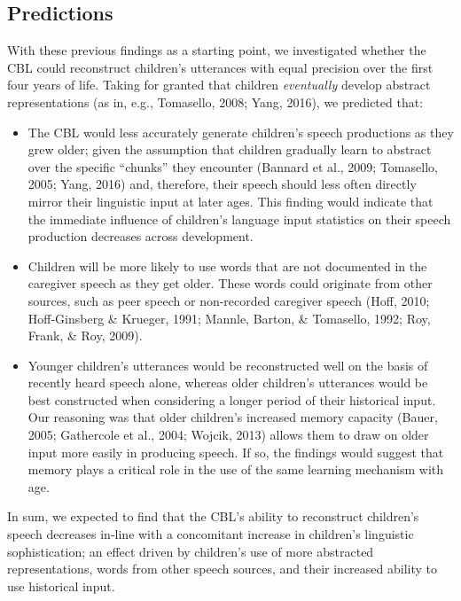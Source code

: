 \documentclass[
  english,
  man,floatsintext]{apa6}
\providecommand{\tightlist}{%
  \setlength{\itemsep}{0pt}\setlength{\parskip}{0pt}}
\begin{document}
\hypertarget{predictions}{%
\subsection{Predictions}\label{predictions}}

With these previous findings as a starting point, we investigated whether the CBL could reconstruct children's utterances with equal precision over the first four years of life. Taking for granted that children \emph{eventually} develop abstract representations (as in, e.g., Tomasello, 2008; Yang, 2016), we predicted that:

\begin{itemize}
\tightlist
\item
  The CBL would less accurately generate children's speech productions as they grew older; given the assumption that children gradually learn to abstract over the specific \enquote{chunks} they encounter (Bannard et al., 2009; Tomasello, 2005; Yang, 2016) and, therefore, their speech should less often directly mirror their linguistic input at later ages. This finding would indicate that the immediate influence of children's language input statistics on their speech production decreases across development.
\item
  Children will be more likely to use words that are not documented in the caregiver speech as they get older. These words could originate from other sources, such as peer speech or non-recorded caregiver speech (Hoff, 2010; Hoff-Ginsberg \& Krueger, 1991; Mannle, Barton, \& Tomasello, 1992; Roy, Frank, \& Roy, 2009).
\item
  Younger children's utterances would be reconstructed well on the basis of recently heard speech alone, whereas older children's utterances would be best constructed when considering a longer period of their historical input. Our reasoning was that older children's increased memory capacity (Bauer, 2005; Gathercole et al., 2004; Wojcik, 2013) allows them to draw on older input more easily in producing speech. If so, the findings would suggest that memory plays a critical role in the use of the same learning mechanism with age.
\end{itemize}

In sum, we expected to find that the CBL's ability to reconstruct children's speech decreases in-line with a concomitant increase in children's linguistic sophistication; an effect driven by children's use of more abstracted representations, words from other speech sources, and their increased ability to use historical input.
\end{document}
